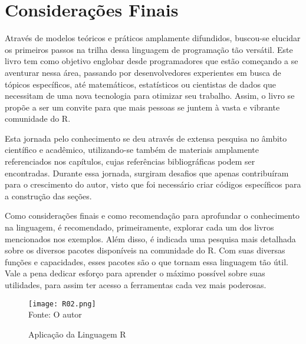 %



\chapter{Considera\c{c}\~{o}es Finais}


Através de modelos teóricos e práticos amplamente difundidos, buscou-se elucidar os primeiros passos na trilha dessa linguagem de programação tão versátil. Este livro tem como objetivo englobar desde programadores que estão começando a se aventurar nessa área, passando por desenvolvedores experientes em busca de tópicos específicos, até matemáticos, estatísticos ou cientistas de dados que necessitam de uma nova tecnologia para otimizar seu trabalho. Assim, o livro se propõe a ser um convite para que mais pessoas se juntem à vasta e vibrante comunidade do R.\par

Esta jornada pelo conhecimento se deu através de extensa pesquisa no âmbito científico e acadêmico, utilizando-se também de materiais amplamente referenciados nos capítulos, cujas referências bibliográficas podem ser encontradas. Durante essa jornada, surgiram desafios que apenas contribuíram para o crescimento do autor, visto que foi necessário criar códigos específicos para a construção das seções.\par

Como considerações finais e como recomendação para aprofundar o conhecimento na linguagem, é recomendado, primeiramente, explorar cada um dos livros mencionados nos exemplos. Além disso, é indicada uma pesquisa mais detalhada sobre os diversos pacotes disponíveis na comunidade do R. Com suas diversas funções e capacidades, esses pacotes são o que tornam essa linguagem tão útil. Vale a pena dedicar esforço para aprender o máximo possível sobre suas utilidades, para assim ter acesso a ferramentas cada vez mais poderosas.\par



   \begin{figure}[H]
    \begin{center}
        \caption{Aplica\c{c}\~{a}o da Linguagem R} \label{ling2}
        \texttt{[image: R02.png]} \\
        {\tiny \sf Fonte: O autor }
    \end{center}
   \end{figure} 